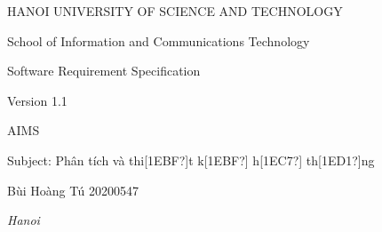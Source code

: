 \clearpage

HANOI UNIVERSITY OF SCIENCE AND TECHNOLOGY

School of Information and Communications Technology


\bigskip

Software Requirement Specification

Version 1.1


\bigskip


\bigskip

AIMS

Subject: Phân tích và thi[1EBF?]t k[1EBF?] h[1EC7?] th[1ED1?]ng


\bigskip


\bigskip


\bigskip

Bùi Hoàng Tú 20200547 


\bigskip


\bigskip


\bigskip


\bigskip

\textit{Hanoi}


\bigskip
\endinput
